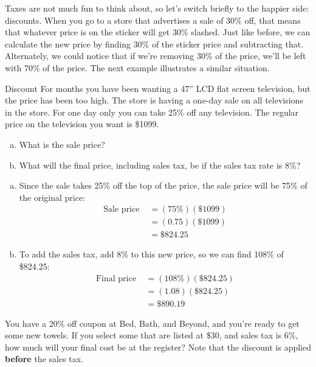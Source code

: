Taxes are not much fun to think about, so let's switch briefly to the happier side: discounts.  When you go to a store that advertises a sale of 30\% off, that means that whatever price is on the sticker will get 30\% slashed.  Just like before, we can calculate the new price by finding 30\% of the sticker price and subtracting that.  Alternately, we could notice that if we're removing 30\% of the price, we'll be left with 70\% of the price.  The next example illustrates a similar situation.
\vfill
\text{}
\pagebreak

\begin{example}{Discount}
\marginnote{\texttt{[image: TV1]}}
For months you have been wanting a 47'' LCD flat screen television, but the price has been too high. The store is having a one-day sale on all televisions in the store. For one day only you can take 25\% off any television. The regular price on the television
you want is \$1099.
\begin{enumerate}[(a)]
\item What is the sale price?
\item What will the final price, including sales tax, be if the sales tax rate is 8\%?
\end{enumerate}

\solline
\begin{enumerate}[(a)]
\item Since the sale takes 25\% off the top of the price, the sale price will be 75\% of the original price:
\begin{align*}
\textrm{Sale price } &= (75\%)(\$1099)\\
&= (0.75)(\$1099)\\
&= \boxed{\$824.25}
\end{align*}

\item To add the sales tax, add 8\% to this new price, so we can find 108\% of \$824.25:
\begin{align*}
\textrm{Final price } &= (108\%)(\$824.25)\\
&= (1.08)(\$824.25)\\
&= \boxed{\$890.19}
\end{align*}
\end{enumerate}
\end{example}

\begin{try}
You have a 20\% off coupon at Bed, Bath, and Beyond, and you're ready to get some new towels.  If you select some that are listed at \$30, and sales tax is 6\%, how much will your final cost be at the register?  Note that the discount is applied \textbf{before} the sales tax.
\end{try}

